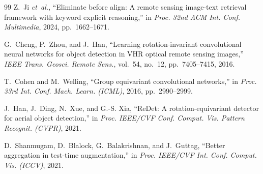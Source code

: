 \documentclass[conference]{IEEEtran}
\begin{document}
\begin{thebibliography}{99}
Z.~Ji \emph{et~al.}, ``Eliminate before align: A remote sensing image-text retrieval framework with keyword explicit reasoning,'' in \emph{Proc. 32nd ACM Int. Conf. Multimedia}, 2024, pp.~1662--1671.

G.~Cheng, P.~Zhou, and J.~Han, ``Learning rotation-invariant convolutional neural networks for object detection in VHR optical remote sensing images,'' \emph{IEEE Trans. Geosci. Remote Sens.}, vol.~54, no.~12, pp.~7405--7415, 2016.

T.~Cohen and M.~Welling, ``Group equivariant convolutional networks,'' in \emph{Proc. 33rd Int. Conf. Mach. Learn. (ICML)}, 2016, pp.~2990--2999.

J.~Han, J.~Ding, N.~Xue, and G.-S. Xia, ``ReDet: A rotation-equivariant detector for aerial object detection,'' in \emph{Proc. IEEE/CVF Conf. Comput. Vis. Pattern Recognit. (CVPR)}, 2021.

D.~Shanmugam, D.~Blalock, G.~Balakrishnan, and J.~Guttag, ``Better aggregation in test-time augmentation,'' in \emph{Proc. IEEE/CVF Int. Conf. Comput. Vis. (ICCV)}, 2021.

\end{thebibliography}
\end{document}
